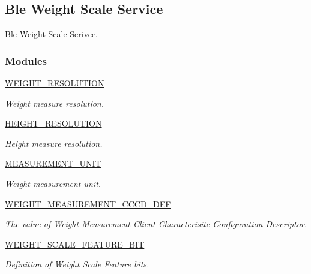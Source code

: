 \hypertarget{group___b_l_e___w_s_s}{}\subsection{Ble Weight Scale Service}
\label{group___b_l_e___w_s_s}


Ble Weight Scale Serivce.  


\subsubsection*{Modules}
\begin{DoxyCompactItemize}
\item 
\hyperlink{group___w_e_i_g_h_t___r_e_s_o_l_u_t_i_o_n}{W\+E\+I\+G\+H\+T\+\_\+\+R\+E\+S\+O\+L\+U\+T\+I\+ON}
\begin{DoxyCompactList}\small\item\em Weight measure resolution. \end{DoxyCompactList}\item 
\hyperlink{group___h_e_i_g_h_t___r_e_s_o_l_u_t_i_o_n}{H\+E\+I\+G\+H\+T\+\_\+\+R\+E\+S\+O\+L\+U\+T\+I\+ON}
\begin{DoxyCompactList}\small\item\em Height measure resolution. \end{DoxyCompactList}\item 
\hyperlink{group___m_e_a_s_u_r_e_m_e_n_t___u_n_i_t}{M\+E\+A\+S\+U\+R\+E\+M\+E\+N\+T\+\_\+\+U\+N\+IT}
\begin{DoxyCompactList}\small\item\em Weight measurement unit. \end{DoxyCompactList}\item 
\hyperlink{group___w_e_i_g_h_t___m_e_a_s_u_r_e_m_e_n_t___c_c_c_d___d_e_f}{W\+E\+I\+G\+H\+T\+\_\+\+M\+E\+A\+S\+U\+R\+E\+M\+E\+N\+T\+\_\+\+C\+C\+C\+D\+\_\+\+D\+EF}
\begin{DoxyCompactList}\small\item\em The value of Weight Measurement Client Characterisitc Configuration Descriptor. \end{DoxyCompactList}\item 
\hyperlink{group___w_e_i_g_h_t___s_c_a_l_e___f_e_a_t_u_r_e___b_i_t}{W\+E\+I\+G\+H\+T\+\_\+\+S\+C\+A\+L\+E\+\_\+\+F\+E\+A\+T\+U\+R\+E\+\_\+\+B\+IT}
\begin{DoxyCompactList}\small\item\em Definition of Weight Scale Feature bits. \end{DoxyCompactList}\item 

\end{DoxyCompactItemize}
